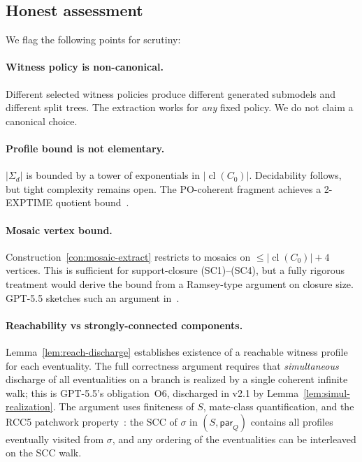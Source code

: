 \documentclass[11pt]{article}
\theoremstyle{definition}
\theoremstyle{remark}
\newcommand{\cl}{\operatorname{cl}}
\begin{document}
\subsection{Honest assessment}

We flag the following points for scrutiny:

\paragraph{Witness policy is non-canonical.}
Different selected witness policies produce different generated
submodels and different split trees.  The extraction works for
\emph{any} fixed policy.  We do not claim a canonical choice.

\paragraph{Profile bound is not elementary.}
$|\Sigma_d|$ is bounded by a tower of exponentials in $|\cl(C_0)|$.
Decidability follows, but tight complexity remains open.  The
PO-coherent fragment achieves a 2-EXPTIME quotient
bound~\cite{TwoTier}.

\paragraph{Mosaic vertex bound.}
Construction~\ref{con:mosaic-extract} restricts to mosaics on
$\le |\cl(C_0)| + 4$ vertices.  This is sufficient for
support-closure (SC1)--(SC4), but a fully rigorous treatment
would derive the bound from a Ramsey-type argument on closure
size.  GPT-5.5 sketches such an argument
in~\cite[Lemma~8.4]{GPT55Generated}.

\paragraph{Reachability vs strongly-connected components.}
Lemma~\ref{lem:reach-discharge} establishes existence of a
reachable witness profile for each eventuality.  The full
correctness argument requires that \emph{simultaneous} discharge
of all eventualities on a branch is realized by a single coherent
infinite walk; this is GPT-5.5's obligation~O6, discharged in v2.1
by Lemma~\ref{lem:simul-realization}.  The argument uses
finiteness of $S$, mate-class quantification, and the
RCC5 patchwork property~\cite{RenzNebel}: the SCC of $\sigma$ in
$(S,\mathsf{par}_Q)$ contains all profiles eventually visited from
$\sigma$, and any ordering of the eventualities can be interleaved
on the SCC walk.
\end{document}
